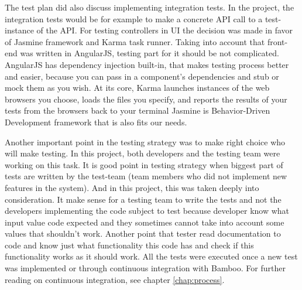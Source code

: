 The test plan did also discuss implementing integration tests. In the project, the integration tests would be for example to make a concrete API call to a test-instance of the API. 
For testing controllers in UI the decision was made in favor of Jasmine framework and Karma task runner.
Taking into account that front-end was written in AngularJS, testing part for it should be not complicated. AngularJS has dependency injection built-in, that makes testing process better and easier, because you can pass in a component's dependencies and stub or mock them as you wish. \textquotedbl At its core, Karma launches instances of the web browsers you choose, loads the files you specify, and reports the results of your tests from the browsers back to your terminal\textquotedbl \cite{Testi43:online} Jasmine is Behavior-Driven Development framework that is also fits our needs.

Another important point in the testing strategy was to make right choice who will make testing. In this project, both developers and the testing team were working on this task. It is good point in testing strategy when biggest part of tests are written by the test-team (team members who did not implement new features in the system). And in this project, this was taken deeply into consideration. It make sense for a testing team to write the tests and not the developers implementing the code subject to test because developer know what input value code expected and they sometimes cannot take into account some values that shouldn't work. Another point that tester read documentation to code and know just what functionality this code has and check if this functionality works as it should work.
All the tests were executed once a new test was implemented or through continuous integration with Bamboo. For further reading on continuous integration, see chapter \ref{chap:process}.

	